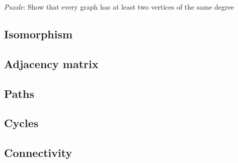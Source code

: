\documentclass[main]{subfiles}
\begin{document}
\textit{Puzzle}: Show that every graph has at least two vertices of the same degree


\subsection{Isomorphism}

\subsection{Adjacency matrix}

\subsection{Paths}

\subsection{Cycles}

\subsection{Connectivity}

\end{document}
